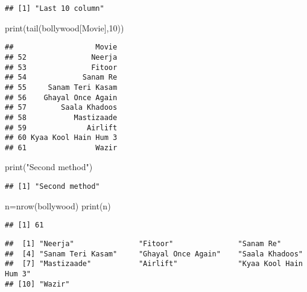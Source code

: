 \documentclass[
]{article}
\newenvironment{Shaded}{\begin{snugshade}}{\end{snugshade}}
\newcommand{\DecValTok}[1]{\textcolor[rgb]{0.00,0.00,0.81}{#1}}
\newcommand{\FunctionTok}[1]{\textcolor[rgb]{0.00,0.00,0.00}{#1}}
\newcommand{\NormalTok}[1]{#1}
\newcommand{\OtherTok}[1]{\textcolor[rgb]{0.56,0.35,0.01}{#1}}
\newcommand{\SpecialCharTok}[1]{\textcolor[rgb]{0.00,0.00,0.00}{#1}}
\newcommand{\StringTok}[1]{\textcolor[rgb]{0.31,0.60,0.02}{#1}}
\begin{document}
\begin{verbatim}
## [1] "Last 10 column"
\end{verbatim}

\begin{Shaded}
\begin{Highlighting}[]
\FunctionTok{print}\NormalTok{(}\FunctionTok{tail}\NormalTok{(bollywood[}\StringTok{\textquotesingle{}Movie\textquotesingle{}}\NormalTok{],}\DecValTok{10}\NormalTok{))}
\end{Highlighting}
\end{Shaded}

\begin{verbatim}
##                   Movie
## 52               Neerja
## 53               Fitoor
## 54             Sanam Re
## 55     Sanam Teri Kasam
## 56    Ghayal Once Again
## 57        Saala Khadoos
## 58           Mastizaade
## 59              Airlift
## 60 Kyaa Kool Hain Hum 3
## 61                Wazir
\end{verbatim}

\begin{Shaded}
\begin{Highlighting}[]
\FunctionTok{print}\NormalTok{(}\StringTok{"Second method"}\NormalTok{)}
\end{Highlighting}
\end{Shaded}

\begin{verbatim}
## [1] "Second method"
\end{verbatim}

\begin{Shaded}
\begin{Highlighting}[]
\NormalTok{n}\OtherTok{=}\FunctionTok{nrow}\NormalTok{(bollywood)}
\FunctionTok{print}\NormalTok{(n)}
\end{Highlighting}
\end{Shaded}

\begin{verbatim}
## [1] 61
\end{verbatim}

\begin{Shaded}
\end{Shaded}

\begin{verbatim}
##  [1] "Neerja"               "Fitoor"               "Sanam Re"            
##  [4] "Sanam Teri Kasam"     "Ghayal Once Again"    "Saala Khadoos"       
##  [7] "Mastizaade"           "Airlift"              "Kyaa Kool Hain Hum 3"
## [10] "Wazir"
\end{verbatim}
\end{document}
